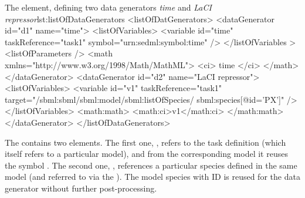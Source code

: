 %
\begin{myXmlLst}{The  element, defining two data generators \emph{time} and \emph{LaCI repressor}}{lst:listOfDataGenerators}
<listOfDatGenerators>
 <dataGenerator id="d1" name="time">
  <listOfVariables>
   <variable id="time" taskReference="task1" symbol="urn:sedml:symbol:time" />
  </listOfVariables >
  <listOfParameters />
  <math xmlns="http://www.w3.org/1998/Math/MathML">
   <ci> time </ci>
  </math>
 </dataGenerator>
 <dataGenerator id="d2" name="LaCI repressor">
  <listOfVariables>
   <variable id="v1" taskReference="task1" 
    target="/sbml:sbml/sbml:model/sbml:listOfSpecies/
            sbml:species[@id='PX']" />
  </listOfVariables>
  <math:math>
   <math:ci>v1</math:ci>
  </math:math>
 </dataGenerator>
</listOfDataGenerators>
\end{myXmlLst}
%
The  contains two  elements. 
The first one, , refers to the task definition  (which itself refers to a particular model), and from the corresponding model it reuses the symbol .
The second one, , references a particular species defined in the same model (and referred to via the ). The model species with ID  is reused for the data generator  without further post-processing.




